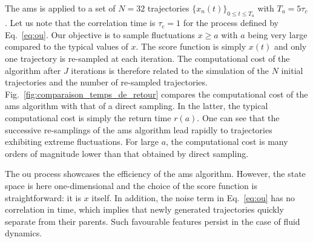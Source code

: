	
	The \ac{ams} is applied  to a set of $N=32$ trajectories $\{x_n(t)\}_{0\leq t \leq T_a}$ with $T_a=5\tau_c$.
	Let us note that the correlation time is $\tau_c = 1$ for the process defined by Eq.~\eqref{eq:ou}.
	Our objective is to sample fluctuations $x\geq a$ with $a$ being very large compared to the typical values of $x$.
	The score function is simply $x(t)$ and only one trajectory is re-sampled at each iteration.
	The computational cost of the algorithm after $J$ iterations is therefore related to the simulation of the $N$ initial trajectories and the number of re-sampled trajectories.
	Fig.~\ref{fig:comparaison_temps_de_retour} compares the computational cost of the \ac{ams} algorithm with that of a direct sampling. 
	In the latter, the typical computational cost is simply the return time $r(a)$.
	One can see that the successive re-samplings of the \ac{ams} algorithm lead rapidly to trajectories exhibiting extreme fluctuations.
	For large $a$, the computational cost is many orders of magnitude lower than that obtained by direct sampling.
	
	The \acl{ou} process showcases the efficiency of the \ac{ams} algorithm.
	However, the state space is here one-dimensional and the choice of the score function is straightforward: it is $x$ itself.
	In addition, the noise term in Eq.~\eqref{eq:ou} has no correlation in time, which implies that newly generated trajectories quickly separate from their parents. Such favourable features  persist in the case of fluid dynamics.